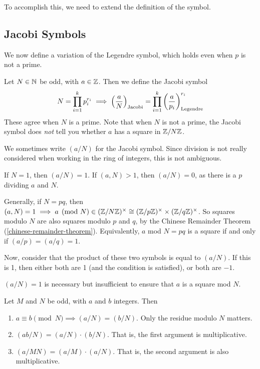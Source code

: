 \documentclass{article}
\begin{document}
To accomplish this, we need to extend the definition of the symbol.


\subsection{Jacobi Symbols}
\label{subsection-quadratic-forms-jacobi-symbol}

We now define a variation of the Legendre symbol, which holds even when $p$ is not a prime.

\begin{definition}
	\label{jacobi-symbol}
    Let $N \in \mathbb{N}$ be odd, with $a \in \mathbb{Z}$. Then we define the Jacobi symbol
    \[
	N = \prod_{i=1}^k p_i^{r_i} \implies
	\left( \frac{a}{N} \right)_\text{Jacobi} = \prod_{i=1}^k \left( \frac{a}{p_i} \right)_\text{Legendre}^{r_i}
	\]
	These agree when $N$ is a prime. Note that when $N$ is not a prime, the Jacobi symbol does \textit{not} tell you whether $a$ has a square in $\mathbb{Z}/N\mathbb{Z}$.
\end{definition}

\begin{note}
	We sometimes write $(a/N)$ for the Jacobi symbol. Since division is not really considered when working in the ring of integers, this is not ambiguous.
\end{note}

If $N = 1$, then $(a/N) = 1$. If $(a, N) > 1$, then $(a/N) = 0$, as there is a $p$ dividing $a$ and $N$.

Generally, if $N = pq$, then $(a, N) = 1 \implies a \pmod{N} \in (\mathbb{Z}/N\mathbb{Z})^\times \cong (\mathbb{Z}/p\mathbb{Z})^\times \times (\mathbb{Z}/q\mathbb{Z})^\times$. So squares modulo $N$ are also squares modulo $p$ and $q$, by the Chinese Remainder Theorem (\ref{chinese-remainder-theorem}). Equivalently, $a$ mod $N = pq$ is a square if and only if $(a/p) = (a/q) = 1$.

Now, consider that the product of these two symbols is equal to $(a/N)$. If this is 1, then either both are 1 (and the condition is satisfied), or both are $-1$.

\begin{corollary}
    $(a/N)= 1$ is necessary but insufficient to ensure that $a$ is a square mod $N$.
\end{corollary}



\begin{proposition}
	\label{jacobi-multiplicity}
    Let $M$ and $N$ be odd, with $a$ and $b$ integers. Then
    \begin{enumerate}
    \item $a \equiv b \pmod{N} \implies (a/N) = (b/N)$. Only the residue modulo $N$ matters.
    \item $(ab/N) = (a/N) \cdot (b/N)$. That is, the first argument is multiplicative.
    \item $(a/MN) = (a/M) \cdot (a/N)$. That is, the second argument is also multiplicative.
	\end{enumerate}
\end{proposition}
\end{document}
